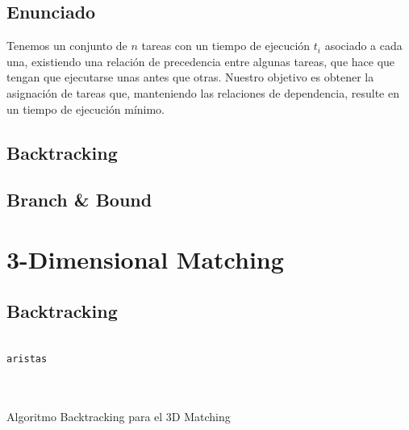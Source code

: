 \documentclass[a4paper, 11pt]{article} %
\let\emptyset\varnothing
\begin{document}
  \subsection{Enunciado}
  Tenemos un conjunto de $n$ tareas con un tiempo de ejecución $t_i$ asociado a cada una, existiendo una relación de precedencia
  entre algunas tareas, que hace que tengan que ejecutarse unas antes que otras. Nuestro objetivo es obtener la asignación de tareas que, manteniendo las relaciones de dependencia, resulte en un tiempo de ejecución mínimo. 
  
  
  \subsection{Backtracking}
  
  \subsection{Branch \& Bound}

\section{3-Dimensional Matching}
  \subsection{Backtracking}
      \begin{algorithm}[H]
      	\begin{algorithmic}[1]
  		\REQUIRE \ \\
        	\texttt{aristas} \\
     	\\\
     	
     	\WHILE{\texttt{posibles\_particiones}$\neq \emptyset$}
		    \ENDIF
		  \ELSE
	        
	        \ENDIF
	      \ENDIF
 		\ENDWHILE
      	\end{algorithmic}
          \caption{Algoritmo Backtracking para el 3D Matching}
          \label{Back-3DMatch}
      \end{algorithm}
  
\end{document}
